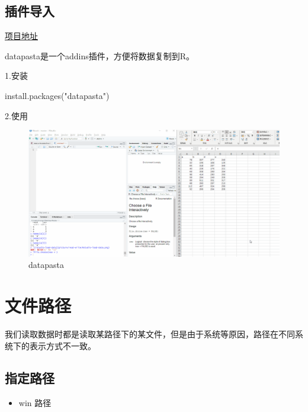 \documentclass[
]{book}
\newenvironment{Shaded}{\begin{snugshade}}{\end{snugshade}}
\newcommand{\FunctionTok}[1]{\textcolor[rgb]{0.00,0.00,0.00}{#1}}
\newcommand{\NormalTok}[1]{#1}
\newcommand{\StringTok}[1]{\textcolor[rgb]{0.31,0.60,0.02}{#1}}
\providecommand{\tightlist}{%
  \setlength{\itemsep}{0pt}\setlength{\parskip}{0pt}}
\begin{document}
\hypertarget{ux63d2ux4ef6ux5bfcux5165}{%
\subsection{插件导入}\label{ux63d2ux4ef6ux5bfcux5165}}

\href{https://github.com/milesmcbain/datapasta}{项目地址}

datapasta是一个addins插件，方便将数据复制到R。

1.安装

\begin{Shaded}
\begin{Highlighting}[]
\FunctionTok{install.packages}\NormalTok{(}\StringTok{"datapasta"}\NormalTok{)}
\end{Highlighting}
\end{Shaded}

2.使用

\begin{figure}
\centering
\includegraphics{picture/read-write/datapasta-copy.gif}
\caption{datapasta}
\end{figure}

\hypertarget{data:file-path}{%
\section{文件路径}\label{data:file-path}}

我们读取数据时都是读取某路径下的某文件，但是由于系统等原因，路径在不同系统下的表示方式不一致。

\hypertarget{ux6307ux5b9aux8defux5f84}{%
\subsection{指定路径}\label{ux6307ux5b9aux8defux5f84}}

\begin{itemize}
\tightlist
\item
  win 路径
\end{itemize}
\end{document}
